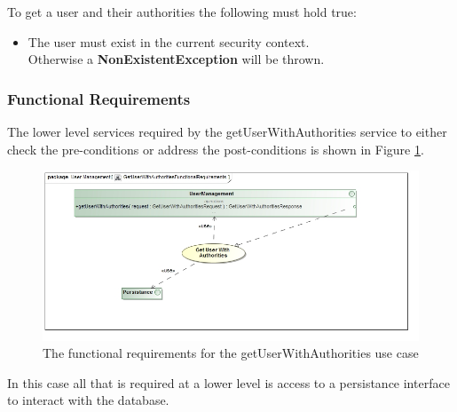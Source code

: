 To get a user and their authorities the following must hold true:
\begin{itemize}
	\item The user must exist in the current security context.\\
	Otherwise a \textbf{NonExistentException} will be thrown.
\end{itemize}

\subsubsection{Functional Requirements}
The lower level services required by the getUserWithAuthorities service
to either check the pre-conditions or address the post-conditions is shown
in Figure \ref{fig:getUserWithAuthoritiesFR}.

\begin{figure}[H]
	\begin{center}
		\includegraphics[scale=0.5]{../Diagrams and Charts/Users/GetUserWithAuthoritiesFunctionalRequirements.jpg}
		\caption{The functional requirements for the getUserWithAuthorities use case}
		\label{fig:getUserWithAuthoritiesFR}
	\end{center}	
\end{figure}

In this case all that is required at a lower level is access to a persistance
interface to interact with the database.